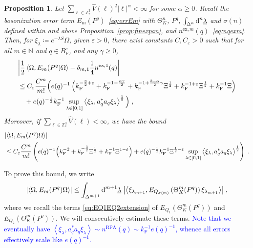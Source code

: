 \documentclass[12pt,a4paper]{article}
\numberwithin{equation}{section}
\newcommand{\NNN}{\mathbb{N}}
\newcommand{\ulambda}{\underline{\lambda}}
\newcommand{\1}{\mathbb{I}}
\newcommand{\di}{\textnormal{d}}
\newcommand{\ex}{\mathrm{ex}}
\newcommand{\F}{\mathrm{F}}
\newcommand{\RPA}{\mathrm{RPA}}
\newcommand{\Z}{\mathbb{Z}}
\newcommand{\half}{\frac{1}{2}}
\newcommand{\eva}[1]{\left\langle #1 \right\rangle}
\theoremstyle{plain}
\newtheorem{proposition}[theorem]{Proposition}
\theoremstyle{definition}
\theoremstyle{remark}
\theoremstyle{plain}
\theoremstyle{definition}
\theoremstyle{remark}
\begin{document}
\begin{proposition} \label{prop:finalEmest}
Let $ \sum_{\ell \in \Z^3_*} \hat{V}(\ell)^2 |\ell|^\alpha < \infty $ for some $ \alpha \ge 0 $. Recall the bosonization error term $E_m(P^q)$~\eqref{eq:errEm} with $ \Theta^n_K $, $ P^q $, $ \int_{\Delta^n} \di^n \ulambda $ and $ \sigma(n) $ defined within and above Proposition~\ref{prop:finexpan}, and $ n^{\ex,m}(q) $~\eqref{eq:nqexm}. Then, for $ \xi_\lambda \coloneq e^{- \lambda S} \Omega $, given $ \varepsilon > 0 $, there exist constants $ C, C_\varepsilon > 0 $ such that for all $ m \in \NNN $ and $ q \in B_{\F}^c $, and any $ \gamma \ge 0 $,
\begin{align} \label{eq:finalEmest_Coulomb}
	&\abs{\half \eva{\Omega, E_m(P^q) \Omega} - \delta_{m,1} \frac 14 n^{\ex,1}(q)} \nonumber\\
	&\leq C_\varepsilon \frac{C^m}{m!}
		\Big( e(q)^{-1}\left( k_{\F}^{-\frac 32 + \varepsilon} 
		+ k_{\F}^{-1 - \frac{\alpha \gamma}{2}} 
		+ k_{\F}^{-1 + \frac{3-\alpha}{2} \gamma} \Xi^\half
		+ k_{\F}^{-1+\varepsilon} \Xi^\half
		+ k_{\F}^{-1} \Xi \right) \nonumber\\
	&\quad + e(q)^{-\half} k_{\F}^{-1} \sup_{\lambda \in [0,1]} \eva{\xi_\lambda, a_q^* a_q \xi_\lambda}^{\half} \Big) \;,
\end{align}
Moreover, if $ \sum_{\ell \in \Z^3_*} \hat{V}(\ell) < \infty $, we have the bound
\begin{align} \label{eq:finalEmest}
	&\abs{\eva{\Omega, E_m(P^q) \Omega}} \nonumber\\
	&\leq C_\varepsilon \frac{C^m}{m!}
		\left( e(q)^{-1}
		\Big( k_{\F}^{-2}
		+ k_{\F}^{-\frac{3}{2}} \Xi^\half
		+ k_{\F}^{-1} \Xi^{1-\varepsilon} \Big)
		+ e(q)^{-\half} k_{\F}^{-1} \Xi^{\half - \varepsilon} 
		\sup_{\lambda \in [0,1]} \eva{\xi_\lambda, a_q^* a_q \xi_\lambda}^{\half}  \right)\;.
\end{align}
\end{proposition}

To prove this bound, we write
\begin{equation} \label{eq:errEm2}
	\abs{\eva{\Omega, E_m(P^q) \Omega }}
	\le \int_{\Delta^{m+1}} \di^{m+1} \underline{\lambda} \;
		\abs{\eva{\xi_{\lambda_{m+1}}, E_{Q_{\sigma(m)}}\left(\Theta^{m}_{K}(P^q)\right) \xi_{\lambda_{m+1}}}} \;,
\end{equation}
where we recall the terms \eqref{eq:EQ1EQ2extension} of $ E_{Q_1}(\Theta^m_{K}(P^q)) $ and $ E_{Q_2}(\Theta^m_{K}(P^q)) $. We will consecutively estimate these terms.
\textcolor{blue}{
Note that we eventually have $ \eva{\xi_\lambda, a_q^* a_q \xi_\lambda} \sim n^{\RPA}(q) \sim k_{\F}^{-1} e(q)^{-1} $, whence all errors effectively scale like $ e(q)^{-1} $.
}
\end{document}
